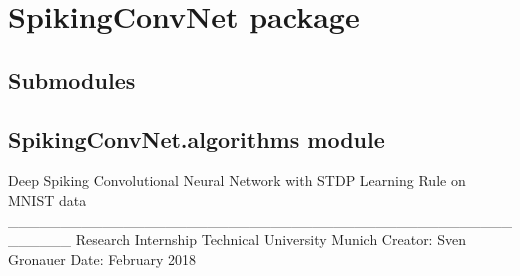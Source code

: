 \documentclass[letterpaper,10pt,english]{sphinxmanual}
\begin{document}
\section{SpikingConvNet package}
\label{\detokenize{SpikingConvNet:spikingconvnet-package}}\label{\detokenize{SpikingConvNet::doc}}

\subsection{Submodules}
\label{\detokenize{SpikingConvNet:submodules}}

\subsection{SpikingConvNet.algorithms module}
\label{\detokenize{SpikingConvNet:module-SpikingConvNet.algorithms}}\label{\detokenize{SpikingConvNet:spikingconvnet-algorithms-module}}
Deep Spiking Convolutional Neural Network
with STDP Learning Rule on MNIST data
\_\_\_\_\_\_\_\_\_\_\_\_\_\_\_\_\_\_\_\_\_\_\_\_\_\_\_\_\_\_\_\_\_\_\_\_\_\_\_\_\_\_\_\_\_\_\_\_\_\_\_\_\_\_
Research Internship
Technical University Munich
Creator:    Sven Gronauer
Date:       February 2018
\end{document}
